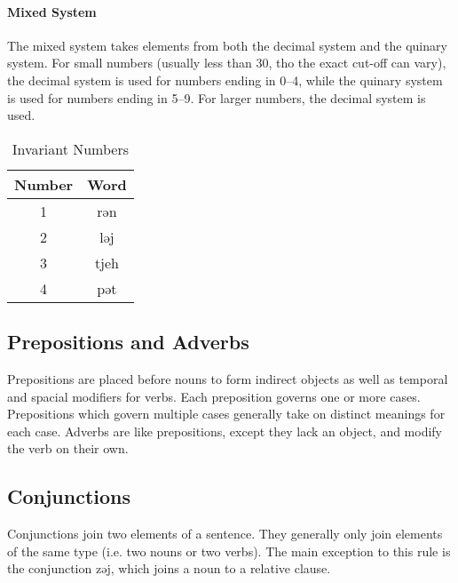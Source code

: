 \paragraph{Mixed System} The mixed system takes elements from both the decimal
system and the quinary system. For small numbers (usually less than 30, tho the
exact cut-off can vary), the decimal system is used for numbers ending in 0--4,
while the quinary system is used for numbers ending in 5--9. For larger
numbers, the decimal system is used.

\begin{table}[h]
\centering
\caption{Invariant Numbers}
\label{tab:numbers}
\begin{tabular}{c>{\ll}c}
    \toprule
    Number & \rm Word \\ \midrule
    1  & rən \\
    2  & ləj \\
    3  & tjeh \\
    4  & pət \\
    \bottomrule
\end{tabular}
\end{table}

\subsection{Prepositions and Adverbs}
Prepositions are placed before nouns to form indirect objects as well as
temporal and spacial modifiers for verbs. Each preposition governs one or more
cases. Prepositions which govern multiple cases generally take on distinct
meanings for each case. Adverbs are like prepositions, except they lack an
object, and modify the verb on their own.

\subsection{Conjunctions}
Conjunctions join two elements of a sentence. They generally only join elements
of the same type (i.e. two nouns or two verbs). The main exception to this rule
is the conjunction {\ll zəj}, which joins a noun to a relative clause.

